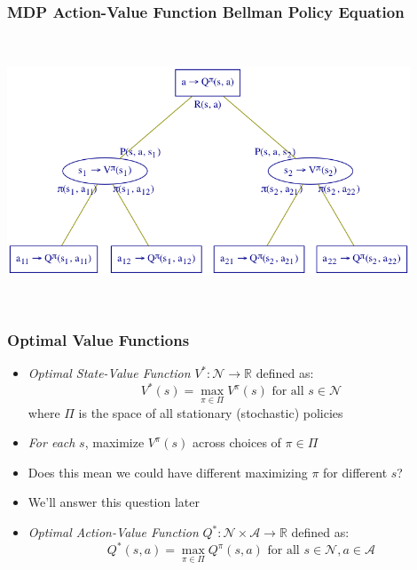 \documentclass[handout]{beamer}
\begin{document}
\begin{frame}
\frametitle{MDP Action-Value Function Bellman Policy Equation}
\includegraphics[width=12cm, height=8cm]{mdp_bellman_policy_tree_qq.png}
\end{frame}

\begin{frame}
\frametitle{Optimal Value Functions}
\pause
\begin{itemize}[<+->]
\item {\em Optimal State-Value Function} $V^*: \mathcal{N} \rightarrow \mathbb{R}$ defined as:
$$V^*(s) = \max_{\pi \in \Pi} V^{\pi}(s) \text{ for all } s \in \mathcal{N}$$
where $\Pi$ is the space of all stationary (stochastic) policies
\item {\em For each} $s$, maximize $V^{\pi}(s)$ across choices of $\pi \in \Pi$
\item Does this mean we could have different maximizing $\pi$ for different $s$?
\item We'll answer this question later
\item {\em Optimal Action-Value Function} $Q^*: \mathcal{N} \times \mathcal{A} \rightarrow \mathbb{R}$ defined as:
$$Q^*(s, a) = \max_{\pi \in \Pi} Q^{\pi}(s, a) \text{ for all } s \in \mathcal{N}, a \in \mathcal{A}$$
\end{itemize}
\end{frame}
\end{document}
